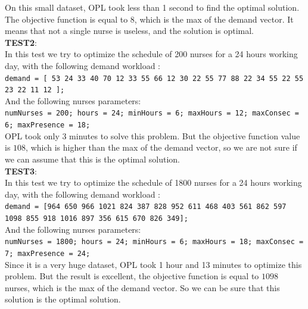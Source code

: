 \documentclass[11pt]{article}
\begin{document}
On this small dataset, OPL took less than 1 second to find the optimal solution. The objective function is equal to $8$, which is the max of the demand vector. It means that not a single nurse is useless, and the solution is optimal. \\

\noindent
{\bf TEST2}:\\
In this test we try to optimize the schedule of 200 nurses for a 24 hours working day, with the following demand workload : \\
{\tt demand = [ 53 24 33 40 70 12 33 55 66 12 30 22 55 77 88 22 34 55 22 55 23 22 11 12 ];}\\
And the following nurses parameters:\\
{\tt numNurses = 200;
 hours =  24;
 minHours = 6;
 maxHours = 12;
 maxConsec = 6;
 maxPresence = 18;}\\

OPL took only 3 minutes to solve this problem. But the objective function value is $108$, which is higher than the max of the demand vector, so we are not sure if we can assume that this is the optimal solution. \\

\noindent
{\bf TEST3}:\\
In this test we try to optimize the schedule of 1800 nurses for a 24 hours working day, with the following demand workload : \\
{\tt demand = [964 650 966 1021 824 387 828 952 611 468 403 561 862 597 1098 855 918 1016 897 356 615 670 826 349]; }\\
And the following nurses parameters:\\
{\tt numNurses = 1800;
 hours =  24;
 minHours = 6;
 maxHours = 18;
 maxConsec = 7;
 maxPresence = 24;}\\

Since it is a very huge dataset, OPL took 1 hour and 13 minutes to optimize this problem. But the result is excellent, the objective function is equal to $1098$ nurses, which is the max of the demand vector. So we can be sure that this solution is the optimal solution. 

\pagebreak

\end{document}

